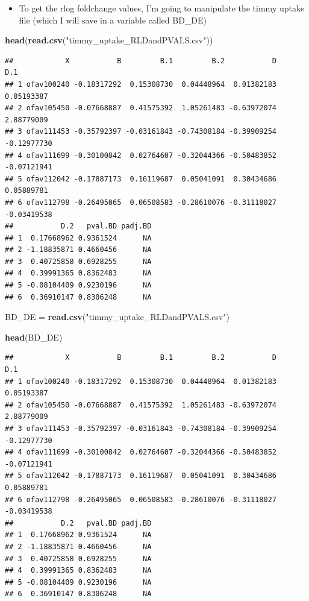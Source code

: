 \documentclass[
]{article}
\newenvironment{Shaded}{\begin{snugshade}}{\end{snugshade}}
\newcommand{\KeywordTok}[1]{\textcolor[rgb]{0.13,0.29,0.53}{\textbf{#1}}}
\newcommand{\NormalTok}[1]{#1}
\newcommand{\StringTok}[1]{\textcolor[rgb]{0.31,0.60,0.02}{#1}}
\providecommand{\tightlist}{%
  \setlength{\itemsep}{0pt}\setlength{\parskip}{0pt}}
\begin{document}
\begin{itemize}
\tightlist
\item
  To get the rlog foldchange values, I'm going to manipulate the timmy
  uptake file (which I will save in a variable called BD\_DE)
\end{itemize}

\begin{Shaded}
\begin{Highlighting}[]
\KeywordTok{head}\NormalTok{(}\KeywordTok{read.csv}\NormalTok{(}\StringTok{"timmy_uptake_RLDandPVALS.csv"}\NormalTok{))}
\end{Highlighting}
\end{Shaded}

\begin{verbatim}
##            X           B         B.1         B.2           D         D.1
## 1 ofav100240 -0.18317292  0.15308730  0.04448964  0.01382183  0.05193387
## 2 ofav105450 -0.07668887  0.41575392  1.05261483 -0.63972074  2.88779009
## 3 ofav111453 -0.35792397 -0.03161843 -0.74308184 -0.39909254 -0.12977730
## 4 ofav111699 -0.30100842  0.02764607 -0.32044366 -0.50483852 -0.07121941
## 5 ofav112042 -0.17887173  0.16119687  0.05041091  0.30434686  0.05889781
## 6 ofav112798 -0.26495065  0.06508583 -0.28610076 -0.31118027 -0.03419538
##           D.2   pval.BD padj.BD
## 1  0.17668962 0.9361524      NA
## 2 -1.18835871 0.4660456      NA
## 3  0.40725858 0.6928255      NA
## 4  0.39991365 0.8362483      NA
## 5 -0.08104409 0.9230196      NA
## 6  0.36910147 0.8306248      NA
\end{verbatim}

\begin{Shaded}
\begin{Highlighting}[]
\NormalTok{BD_DE =}\StringTok{ }\KeywordTok{read.csv}\NormalTok{(}\StringTok{"timmy_uptake_RLDandPVALS.csv"}\NormalTok{)}

\KeywordTok{head}\NormalTok{(BD_DE)}
\end{Highlighting}
\end{Shaded}

\begin{verbatim}
##            X           B         B.1         B.2           D         D.1
## 1 ofav100240 -0.18317292  0.15308730  0.04448964  0.01382183  0.05193387
## 2 ofav105450 -0.07668887  0.41575392  1.05261483 -0.63972074  2.88779009
## 3 ofav111453 -0.35792397 -0.03161843 -0.74308184 -0.39909254 -0.12977730
## 4 ofav111699 -0.30100842  0.02764607 -0.32044366 -0.50483852 -0.07121941
## 5 ofav112042 -0.17887173  0.16119687  0.05041091  0.30434686  0.05889781
## 6 ofav112798 -0.26495065  0.06508583 -0.28610076 -0.31118027 -0.03419538
##           D.2   pval.BD padj.BD
## 1  0.17668962 0.9361524      NA
## 2 -1.18835871 0.4660456      NA
## 3  0.40725858 0.6928255      NA
## 4  0.39991365 0.8362483      NA
## 5 -0.08104409 0.9230196      NA
## 6  0.36910147 0.8306248      NA
\end{verbatim}
\end{document}
